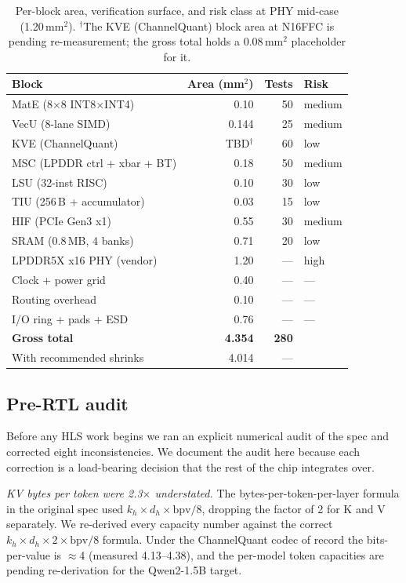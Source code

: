 \documentclass[conference]{IEEEtran}
\begin{document}
\begin{table}[t]
\centering
\caption{Per-block area, verification surface, and risk class at PHY mid-case (1.20\,mm$^2$). $^\dagger$The KVE (ChannelQuant) block area at N16FFC is pending re-measurement; the gross total holds a 0.08\,mm$^2$ placeholder for it.}
\label{tab:area}
\setlength{\tabcolsep}{4pt}
\renewcommand{\arraystretch}{1.05}
\footnotesize
\begin{tabular}{lrrl}
\toprule
\textbf{Block} & \textbf{Area (mm$^2$)} & \textbf{Tests} & \textbf{Risk} \\
\midrule
MatE (8$\times$8 INT8$\times$INT4) & 0.10 & 50 & medium \\
VecU (8-lane SIMD)         & 0.144 & 25 & medium \\
KVE (ChannelQuant)         & TBD$^\dagger$ & 60 & low \\
MSC (LPDDR ctrl + xbar + BT) & 0.18 & 50 & medium \\
LSU (32-inst RISC)         & 0.10 & 30 & low \\
TIU (256\,B + accumulator) & 0.03 & 15 & low \\
HIF (PCIe Gen3 x1)         & 0.55 & 30 & medium \\
\midrule
SRAM (0.8\,MB, 4 banks)    & 0.71 & 20 & low \\
LPDDR5X x16 PHY (vendor)   & 1.20 & --- & high \\
\midrule
Clock + power grid         & 0.40 & --- & --- \\
Routing overhead           & 0.10 & --- & --- \\
I/O ring + pads + ESD      & 0.76 & --- & --- \\
\midrule
\textbf{Gross total}       & \textbf{4.354} & \textbf{280} & \\
With recommended shrinks   & 4.014 & --- & \\
\bottomrule
\end{tabular}
\end{table}

\subsection{Pre-RTL audit}

Before any HLS work begins we ran an explicit numerical audit of the spec and corrected eight inconsistencies. We document the audit here because each correction is a load-bearing decision that the rest of the chip integrates over.

\textit{KV bytes per token were 2.3$\times$ understated.} The bytes-per-token-per-layer formula in the original spec used $k_h \times d_h \times \mathrm{bpv}/8$, dropping the factor of 2 for K and V separately. We re-derived every capacity number against the correct $k_h \times d_h \times 2 \times \mathrm{bpv}/8$ formula. Under the ChannelQuant codec of record the bits-per-value is $\approx$4 (measured 4.13--4.38), and the per-model token capacities are pending re-derivation for the Qwen2-1.5B target.
\end{document}

